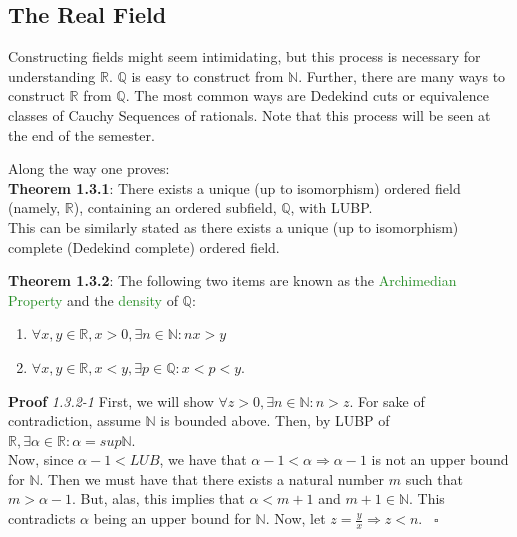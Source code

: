 \documentclass{article}
\begin{document}
\subsection{The Real Field}

Constructing fields might seem intimidating, but this process is necessary for understanding $\mathbb{R}$. $\mathbb{Q}$ is easy to construct from $\mathbb{N}$. Further, there are many ways to construct $\mathbb{R}$ from $\mathbb{Q}$. The most common ways are Dedekind cuts or equivalence classes of Cauchy Sequences of rationals. Note that this process will be seen at the end of the semester. %

Along the way one proves:\\

\textbf{Theorem 1.3.1}: There exists a unique (up to isomorphism) ordered field (namely, $\mathbb{R}$), containing an ordered subfield, $\mathbb{Q}$, with LUBP.\\

This can be similarly stated as there exists a unique (up to isomorphism) complete (Dedekind complete) ordered field.

\textbf{Theorem 1.3.2}: The following two items are known as the \textcolor{ForestGreen}{Archimedian Property} and the \textcolor{ForestGreen}{density} of $\mathbb{Q}$:
\begin{enumerate}
    \item $\forall x,y \in \mathbb{R}, x>0, \exists n \in \mathbb{N}: nx>y$
    \item $\forall x,y \in \mathbb{R}, x<y, \exists p \in \mathbb{Q}:x<p<y$.
\end{enumerate}

\textbf{Proof} \textit{1.3.2-1} First, we will show $\forall z >0, \exists n \in \mathbb{N}: n>z$. For sake of contradiction, assume $\mathbb{N}$ is bounded above. Then, by LUBP of $\mathbb{R}, \exists \alpha \in \mathbb{R}: \alpha=sup\mathbb{N}$. \\

Now, since $\alpha - 1 < LUB$, we have that $\alpha - 1 < \alpha \Longrightarrow \alpha - 1$ is not an upper bound for $\mathbb{N}$. Then we must have that there exists a natural number $m$ such that $m>\alpha - 1$. But, alas, this implies that $\alpha < m+1$ and $m + 1 \in \mathbb{N}$. This contradicts $\alpha$ being an upper bound for $\mathbb{N}$. Now, let $z = \frac{y}{x} \Longrightarrow z < n$. \ $\square$\\
\end{document}
